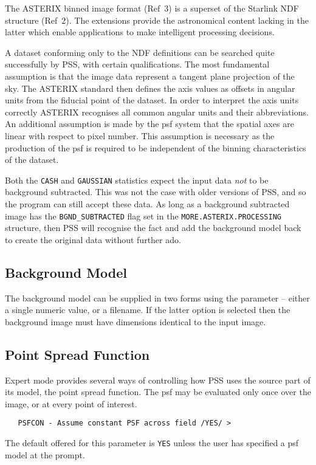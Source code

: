 The ASTERIX binned image format (Ref~3) is a superset of the Starlink NDF 
structure (Ref~2). The extensions provide the astronomical content 
lacking in the latter which enable applications to make intelligent 
processing decisions.

A dataset conforming only to the NDF definitions can be searched quite
successfully by PSS, with certain qualifications. The most fundamental
assumption is that the image data represent a tangent plane projection
of the sky. The ASTERIX standard then defines the axis values
as offsets in angular units from the fiducial point of the dataset. In
order to interpret the axis units correctly ASTERIX recognises all common
angular units and their abbreviations. An additional assumption is made
by the psf system that the spatial axes are linear with respect to pixel
number. This assumption is necessary as the production of the psf is
required to be independent of the binning characteristics of the dataset.

Both the \verb+CASH+ and \verb+GAUSSIAN+ statistics expect the input
data {\em not} to be background subtracted. This was not the case with
older versions of PSS, and so the program can still accept these data.
As long as a background subtracted image has
the \verb+BGND_SUBTRACTED+ flag set in the
\verb+MORE.ASTERIX.PROCESSING+ structure, then PSS will recognise the
fact and add the background model back to create the original data without
further ado.

\subsection{Background Model}

The background model can be supplied in two forms using the  
parameter --
either a single numeric value, or a filename. If the latter option is selected
then the background image must have dimensions identical to the input image.

\subsection{Point Spread Function}
\label{pss:ref:psfs}
Expert mode provides several ways of controlling how PSS uses the source
part of its model, the point spread function. The psf may be evaluated
only once over the image, or at every point of interest.
\begin{verbatim}
   PSFCON - Assume constant PSF across field /YES/ > 
\end{verbatim}
The default offered for this parameter is \verb+YES+ unless the user has
specified a psf model at the  prompt.

